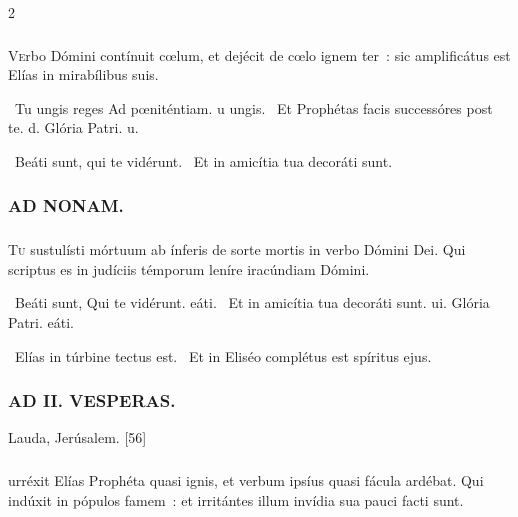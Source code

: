 \documentclass[9pt,twoside]{extarticle}
\begin{document}
\begin{multicols}{2}
{{{\subsubsection*{}
\lettrine{V}erbo Dómini contínuit cœlum, et dejécit de cœlo ignem ter~: sic amplificátus est Elías in mirabílibus suis.

\begin{tightlist}
\item {}~Tu ungis reges \textred{*} Ad pœniténtiam. u ungis. ~Et Prophétas facis successóres post te. d. Glória Patri. u.
\item {}~Beáti sunt, qui te vidérunt. ~Et in amicítia tua decoráti sunt.
\end{tightlist}

\subsubsection*{\center \textsc{AD NONAM.}}
\subsubsection*{}
\lettrine{T}u sustulísti mórtuum ab ínferis de sorte mortis in verbo Dómini Dei. Qui scriptus es in judíciis témporum leníre iracúndiam Dómini.

\begin{tightlist}
\item {}~Beáti sunt, \textred{*} Qui te vidérunt. eáti. ~Et in amicítia tua decoráti sunt. ui. Glória Patri. eáti.
\item {}~Elías in túrbine tectus est. ~Et in Eliséo complétus est spíritus ejus.
\end{tightlist}

\subsubsection*{\center \textsc{AD II. VESPERAS.}}
\begin{tightlist}
\item {} Lauda, Jerúsalem. [56]
\end{tightlist}

\subsubsection*{}
urréxit Elías Prophéta quasi ignis, et verbum ipsíus quasi fácula ardébat. Qui indúxit in pópulos famem~: et irritántes illum invídia sua pauci facti sunt.

}}}
\end{multicols}
\end{document}
